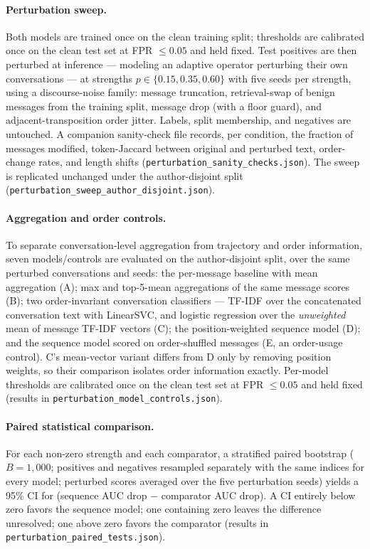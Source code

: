 \documentclass[11pt]{article}
\begin{document}
\paragraph{Perturbation sweep.}
Both models are trained once on the clean training split; thresholds are calibrated once on the clean test set at FPR $\leq 0.05$ and held fixed. Test positives are then perturbed at inference --- modeling an adaptive operator perturbing their own conversations --- at strengths $p \in \{0.15, 0.35, 0.60\}$ with five seeds per strength, using a discourse-noise family: message truncation, retrieval-swap of benign messages from the training split, message drop (with a floor guard), and adjacent-transposition order jitter. Labels, split membership, and negatives are untouched. A companion sanity-check file records, per condition, the fraction of messages modified, token-Jaccard between original and perturbed text, order-change rates, and length shifts (\texttt{perturbation\_sanity\_checks.json}). The sweep is replicated unchanged under the author-disjoint split (\texttt{perturbation\_sweep\_author\_disjoint.json}).

\paragraph{Aggregation and order controls.}
To separate conversation-level aggregation from trajectory and order information, seven models/controls are evaluated on the author-disjoint split, over the same perturbed conversations and seeds: the per-message baseline with mean aggregation (A); max and top-5-mean aggregations of the same message scores (B); two order-invariant conversation classifiers --- TF-IDF over the concatenated conversation text with LinearSVC, and logistic regression over the \emph{unweighted} mean of message TF-IDF vectors (C); the position-weighted sequence model (D); and the sequence model scored on order-shuffled messages (E, an order-usage control). C's mean-vector variant differs from D only by removing position weights, so their comparison isolates order information exactly. Per-model thresholds are calibrated once on the clean test set at FPR $\leq 0.05$ and held fixed (results in \texttt{perturbation\_model\_}\allowbreak\texttt{controls.json}).

\paragraph{Paired statistical comparison.}
For each non-zero strength and each comparator, a stratified paired bootstrap ($B = 1{,}000$; positives and negatives resampled separately with the same indices for every model; perturbed scores averaged over the five perturbation seeds) yields a 95\% CI for (sequence AUC drop $-$ comparator AUC drop). A CI entirely below zero favors the sequence model; one containing zero leaves the difference unresolved; one above zero favors the comparator (results in \texttt{perturbation\_paired\_}\allowbreak\texttt{tests.json}).
\end{document}
